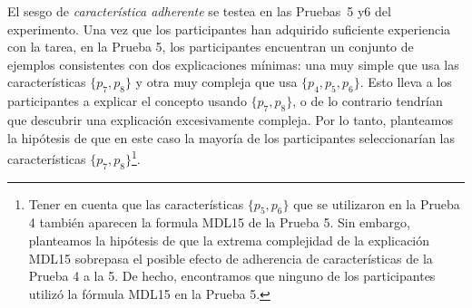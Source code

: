 \begin{hyp}\label{Hip:FeatureBiasStickiness}
El sesgo de \textit{característica adherente} se testea en las Pruebas~5 y6 del experimento. Una vez que los participantes han adquirido suficiente experiencia con la tarea, en la Prueba 5, los participantes encuentran un conjunto de ejemplos consistentes con dos explicaciones mínimas: una muy simple que usa las características $\{p_7, p_8 \}$ y otra muy compleja que usa $\{p_4, p_5, p_6 \}$. Esto lleva a los participantes a explicar el concepto usando $\{p_7, p_8 \} $, o de lo contrario tendrían que descubrir una explicación excesivamente compleja. Por lo tanto, planteamos la hipótesis de que en este caso la mayoría de los participantes seleccionarían las características $\{p_7, p_8 \}$\footnote{Tener en cuenta que las características $\{p_5, p_6 \}$ que se utilizaron en la Prueba 4 también aparecen la formula MDL15 de la Prueba 5. Sin embargo, planteamos la hipótesis de que la extrema complejidad de la explicación MDL15 sobrepasa el posible efecto de adherencia de características de la Prueba 4 a la 5. De hecho, encontramos que ninguno de los participantes utilizó la fórmula MDL15 en la Prueba 5.}.
    

\end{hyp}
